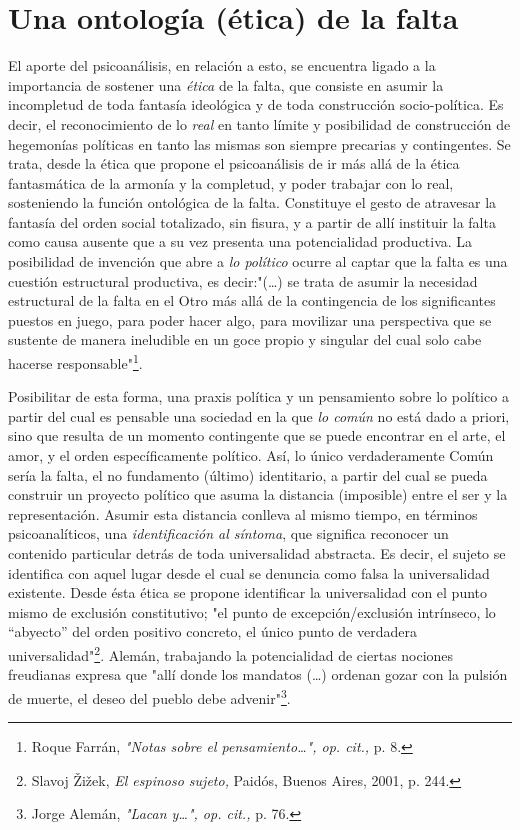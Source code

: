 \section{Una ontología (ética) de la falta}

El aporte del psicoanálisis, en relación a esto, se encuentra ligado a
la importancia de sostener una \emph{ética} de la falta, que consiste en
asumir la incompletud de toda fantasía ideológica y de toda construcción
socio-política. Es decir, el reconocimiento de lo \emph{real} en tanto
límite y posibilidad de construcción de hegemonías políticas en tanto
las mismas son siempre precarias y contingentes. Se trata, desde la
ética que propone el psicoanálisis de ir más allá de la ética
fantasmática de la armonía y la completud, y poder trabajar con lo real,
sosteniendo la función ontológica de la falta. Constituye el gesto de
atravesar la fantasía del orden social totalizado, sin fisura, y a
partir de allí instituir la falta como causa ausente que a su vez
presenta una potencialidad productiva. La posibilidad de invención que
abre a \emph{lo político} ocurre al captar que la falta es una cuestión
estructural productiva, es decir:"(\dots) se trata de asumir la
necesidad estructural de la falta en el Otro más allá de la contingencia
de los significantes puestos en juego, para poder hacer algo, para
movilizar una perspectiva que se sustente de manera ineludible en un
goce propio y singular del cual solo cabe hacerse
responsable"\footnote{Roque Farrán, \emph{"Notas sobre el
  pensamiento\ldots", op. cit.,} p. 8.}.

Posibilitar de esta forma, una praxis política y un pensamiento sobre lo
político a partir del cual es pensable una sociedad en la que \emph{lo
común} no está dado a priori, sino que resulta de un momento contingente
que se puede encontrar en el arte, el amor, y el orden específicamente
político. Así, lo único verdaderamente Común sería la falta, el no
fundamento (último) identitario, a partir del cual se pueda construir un
proyecto político que asuma la distancia (imposible) entre el ser y la
representación. Asumir esta distancia conlleva al mismo tiempo, en
términos psicoanalíticos, una \emph{identificación al síntoma}, que
significa reconocer un contenido particular detrás de toda universalidad
abstracta. Es decir, el sujeto se identifica con aquel lugar desde el
cual se denuncia como falsa la universalidad existente. Desde ésta ética
se propone identificar la universalidad con el punto mismo de exclusión
constitutivo; "el punto de excepción/exclusión intrínseco, lo
``abyecto'' del orden positivo concreto, el único punto de verdadera
universalidad"\footnote{Slavoj Žižek, \emph{El espinoso sujeto,} Paidós,
  Buenos Aires, 2001, p. 244.}. Alemán, trabajando la potencialidad de
ciertas nociones freudianas expresa que "allí donde los mandatos
(\dots) ordenan gozar con la pulsión de muerte, el deseo del pueblo
debe advenir"\footnote{Jorge Alemán, \emph{"Lacan y\ldots", op. cit.,}
  p. 76.}.

